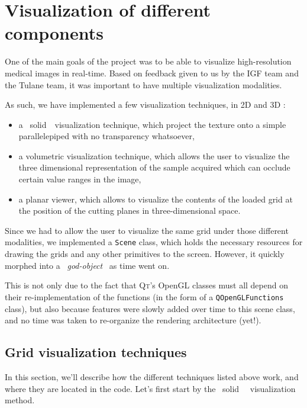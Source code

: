 \section{Visualization of different components}\label{text:03_software_components:02_visualization}
{
	One of the main goals of the project was to be able to visualize high-resolution medical images in real-time. Based on feedback given to us by the IGF team and the Tulane team, it was important to have multiple visualization modalities.\par
	As such, we have implemented a few visualization techniques, in 2D and 3D :\begin{itemize}
		\item a \guillemotleft{}~solid~\guillemotright{}~visualization technique, which project the texture onto a simple parallelepiped with no transparency whatsoever,
		\item a volumetric visualization technique, which allows the user to visualize the three dimensional representation of the sample acquired which can occlude certain value ranges in the image,
		\item a planar viewer, which allows to visualize the contents of the loaded grid at the position of the cutting planes in three-dimensional space.
	\end{itemize}\par
	\myparspace
	Since we had to allow the user to visualize the same grid under those different modalities, we implemented a \texttt{Scene} class, which holds the necessary resources for drawing the grids and any other primitives to the screen. However, it quickly morphed into a \guillemotleft{}~\textit{god-object}\guillemotright{}\footnotemark~ as time went on.\par
	This is not only due to the fact that \textsc{Qt}'s OpenGL classes must all depend on their re-implementation of the functions (in the form of a \texttt{QOpenGLFunctions} class), but also because features were slowly added over time to this scene class, and no time was taken to re-organize the rendering architecture (yet!).\par
	\myparspace

	\subsection{Grid visualization techniques}\label{text:03_software_components:02_visualization:01_grids}
	{
		In this section, we'll describe how the different techniques listed above work, and where they are located in the code. Let's first start by the \guillemotleft{}~solid~\guillemotright{}~ visualization method.
}}
